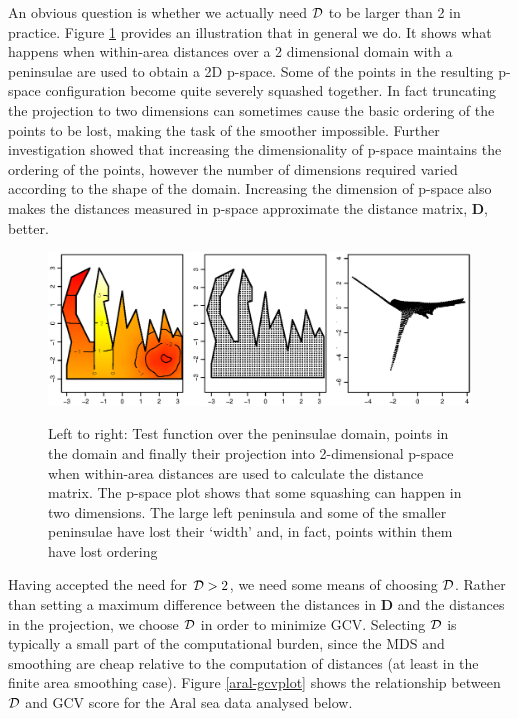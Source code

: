 \documentclass[smallextended]{svjour3}       %
\begin{document}
An obvious question is whether we actually need $\cal D$ to be larger than 2 in practice. Figure \ref{wt2-plot} provides an illustration that in general we do. It shows what happens when within-area distances over a 2 dimensional domain with a peninsulae are used to obtain a 2D p-space. Some of the points in the resulting p-space configuration become quite severely squashed together. In fact truncating the projection to two dimensions can sometimes cause the basic ordering of the points to be lost, making the task of the smoother impossible. Further investigation showed that increasing the dimensionality of p-space maintains the ordering of the points, however the number of dimensions required varied according to the shape of the domain. Increasing the dimension of p-space also makes the distances measured in p-space approximate the distance matrix, $\mathbf{D}$, better.

\begin{figure}
\centering
\includegraphics[width=\textwidth]{Fig3.eps} \\
\caption{Left to right: Test function over the peninsulae domain, points in the domain and finally their projection into 2-dimensional p-space when within-area distances are used to calculate the distance matrix. The p-space plot shows that some squashing can happen in two dimensions. The large left peninsula and some of the smaller peninsulae have lost their `width' and, in fact, points within them have lost ordering}
\label{wt2-plot}
\end{figure}

Having accepted the need for ${\cal D}>2$, we need some means of choosing $\cal D$. Rather than setting a maximum difference between the distances in $\mathbf{D}$ and the distances in the projection, we choose $\cal D$ in order to minimize GCV. Selecting $\cal D$ is typically a small part of the computational burden, since the MDS and smoothing are cheap relative to the computation of distances (at least in the finite area smoothing case). Figure \ref{aral-gcvplot} shows the relationship between $\cal D$ and GCV score for the Aral sea data analysed below. 
\end{document}
